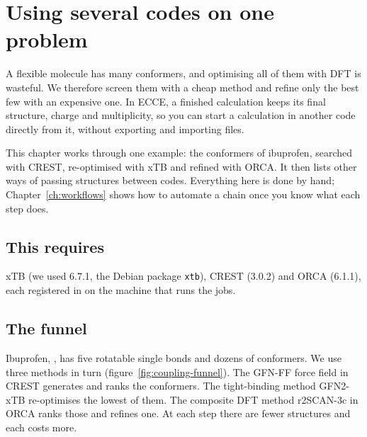 \chapter{Using several codes on one problem}
\label{ch:coupling}

A flexible molecule has many conformers, and optimising all of them with DFT is wasteful. We therefore screen them with a cheap method and refine only the best few with an expensive one. In ECCE, a finished calculation keeps its final structure, charge and multiplicity, so you can start a calculation in another code directly from it, without exporting and importing files.

This chapter works through one example: the conformers of ibuprofen, searched with CREST, re-optimised with xTB and refined with ORCA. It then lists other ways of passing structures between codes. Everything here is done by hand; Chapter~\ref{ch:workflows} shows how to automate a chain once you know what each step does.

\section*{This requires}
xTB (we used 6.7.1, the Debian package \texttt{xtb}), CREST (3.0.2) and ORCA (6.1.1), each registered in  on the machine that runs the jobs.

\section{The funnel}

Ibuprofen, , has five rotatable single bonds and dozens of conformers. We use three methods in turn (figure~\ref{fig:coupling-funnel}). The GFN-FF force field in CREST \cite{pracht2020} generates and ranks the conformers. The tight-binding method GFN2-xTB \cite{bannwarth2019} re-optimises the lowest of them. The composite DFT method r2SCAN-3c \cite{grimme2021} in ORCA ranks those and refines one. At each step there are fewer structures and each costs more.

